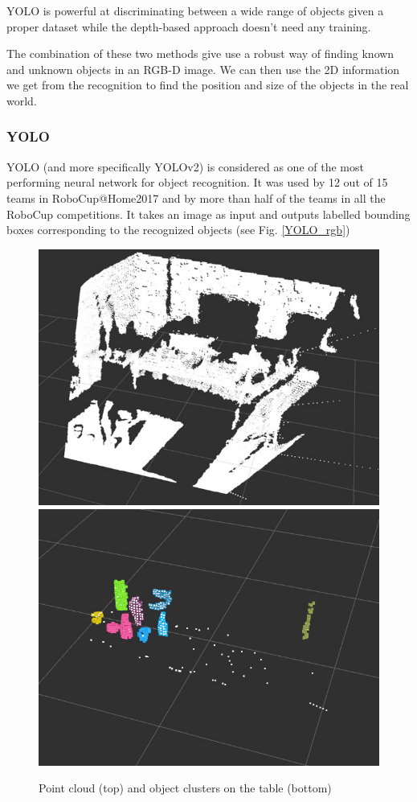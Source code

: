 \documentclass[a4paper, twocolumn]{article}
\begin{document}
  YOLO is powerful at discriminating between a wide range of objects given a proper dataset while the depth-based approach doesn't need any training.

  The combination of these two methods give use a robust way of finding  known and unknown objects in an RGB-D image. We can then use the 2D information we get from the recognition to find the position and size of the objects in the real world.

    \subsubsection{YOLO}

    YOLO (and more specifically YOLOv2) is considered as one of the most performing neural network for object recognition. It was used by 12 out of 15 teams in RoboCup@Home2017 and by more than half of the teams in all the RoboCup competitions. It takes an image as input and outputs labelled bounding boxes corresponding to the recognized objects (see Fig. \ref{YOLO_rgb})

    \begin{figure}
        \includegraphics[width=\columnwidth]{../img/table_pcl.jpg}
        \includegraphics[width=\columnwidth]{../img/cluster_obj_pcl.jpg}
        \caption{Point cloud (top) and object clusters on the table (bottom)}
        \label{pcl_clust}
    \end{figure}
\end{document}
